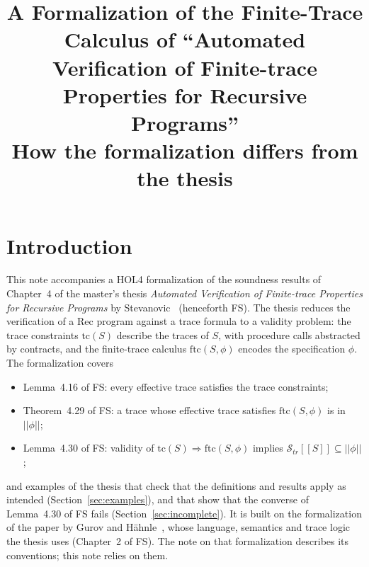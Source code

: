 \documentclass[11pt]{article}
\title{A Formalization of the Finite-Trace Calculus of
  ``Automated Verification of Finite-trace Properties for Recursive
  Programs''\\[0.3em]
  \large How the formalization differs from the thesis}
\author{}
\date{}
\newcommand{\sem}[1]{[\![ #1 ]\!]}
\newcommand{\fsem}[1]{|\!|#1|\!|}
\newcommand{\Str}{{\mathcal{S}_{\mathit{tr}}}}
\newcommand{\tc}{\mathrm{tc}}
\newcommand{\ftc}{\mathrm{ftc}}
\newcommand{\Th}[1]{#1 of FS}
\theoremstyle{plain}
\theoremstyle{definition}
\theoremstyle{remark}
\begin{document}
\maketitle

\section{Introduction}

This note accompanies a HOL4 formalization of the soundness results of
Chapter~4 of the master's thesis \emph{Automated Verification of
Finite-trace Properties for Recursive Programs} by
Stevanovic~\cite{FS} (henceforth FS). The thesis reduces the verification
of a Rec program against a trace formula to a validity problem: the trace
constraints $\tc(S)$ describe the traces of $S$, with procedure calls
abstracted by contracts, and the finite-trace calculus $\ftc(S, \phi)$
encodes the specification $\phi$. The formalization covers
\begin{itemize}
\item \Th{Lemma~4.16}: every effective trace satisfies the trace
  constraints;
\item \Th{Theorem~4.29}: a trace whose effective trace satisfies
  $\ftc(S, \phi)$ is in $\fsem{\phi}$;
\item \Th{Lemma~4.30}: validity of $\tc(S) \Rightarrow \ftc(S, \phi)$
  implies $\Str\sem{S} \subseteq \fsem{\phi}$;
\end{itemize}
and examples of the thesis that check that the definitions and results
apply as intended (Section~\ref{sec:examples}), and that show that the
converse of \Th{Lemma~4.30} fails (Section~\ref{sec:incomplete}).
It is built on the formalization of the paper by Gurov and
H\"ahnle~\cite{GH}, whose language, semantics and trace logic the thesis
uses (\Th{Chapter~2}). The note on that formalization describes its
conventions; this note relies on them.
\end{document}
